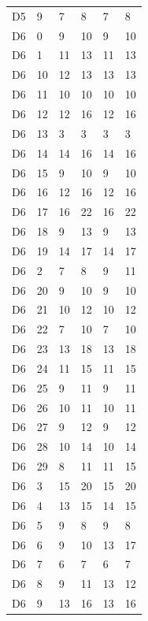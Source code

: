 \begin{longtable}{llllll}
D5 & 9 & 7 & 8 & 7 & 8 \\
D6 & 0 & 9 & 10 & 9 & 10 \\
D6 & 1 & 11 & 13 & 11 & 13 \\
D6 & 10 & 12 & 13 & 13 & 13 \\
D6 & 11 & 10 & 10 & 10 & 10 \\
D6 & 12 & 12 & 16 & 12 & 16 \\
D6 & 13 & 3 & 3 & 3 & 3 \\
D6 & 14 & 14 & 16 & 14 & 16 \\
D6 & 15 & 9 & 10 & 9 & 10 \\
D6 & 16 & 12 & 16 & 12 & 16 \\
D6 & 17 & 16 & 22 & 16 & 22 \\
D6 & 18 & 9 & 13 & 9 & 13 \\
D6 & 19 & 14 & 17 & 14 & 17 \\
D6 & 2 & 7 & 8 & 9 & 11 \\
D6 & 20 & 9 & 10 & 9 & 10 \\
D6 & 21 & 10 & 12 & 10 & 12 \\
D6 & 22 & 7 & 10 & 7 & 10 \\
D6 & 23 & 13 & 18 & 13 & 18 \\
D6 & 24 & 11 & 15 & 11 & 15 \\
D6 & 25 & 9 & 11 & 9 & 11 \\
D6 & 26 & 10 & 11 & 10 & 11 \\
D6 & 27 & 9 & 12 & 9 & 12 \\
D6 & 28 & 10 & 14 & 10 & 14 \\
D6 & 29 & 8 & 11 & 11 & 15 \\
D6 & 3 & 15 & 20 & 15 & 20 \\
D6 & 4 & 13 & 15 & 14 & 15 \\
D6 & 5 & 9 & 8 & 9 & 8 \\
D6 & 6 & 9 & 10 & 13 & 17 \\
D6 & 7 & 6 & 7 & 6 & 7 \\
D6 & 8 & 9 & 11 & 13 & 12 \\
D6 & 9 & 13 & 16 & 13 & 16 \\
\bottomrule
\end{longtable}
